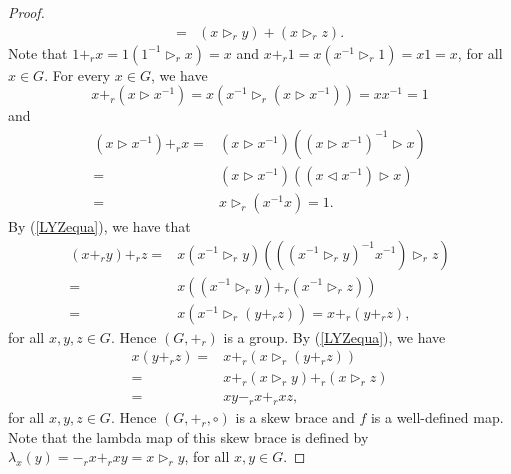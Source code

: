 \begin{proof}
\begin{align}
        =&(x\rhd_r y)+(x\rhd_r z).
    \end{align}
    Note that $1+_r x=1(1^{-1}\rhd_r x)=x$ and
    $x+_r 1=x(x^{-1}\rhd_r 1)=x1=x$,  for all $x\in G$. For every $x\in G$, we have
    \[x+_r (x\rhd x^{-1})=x(x^{-1}\rhd_r(x\rhd x^{-1}))=xx^{-1}=1\]
and
\begin{align*}
    (x\rhd x^{-1})+_r x=&(x\rhd x^{-1})((x\rhd x^{-1})^{-1}\rhd x)\\
    =&(x\rhd x^{-1})((x\lhd x^{-1})\rhd x)\\
    =&x\rhd_r(x^{-1}x)=1.
\end{align*}
By (\ref{LYZequa}), we have that
\begin{align*}
    (x+_r y)+_r z=&x(x^{-1}\rhd_r y)(((x^{-1}\rhd_r y)^{-1}x^{-1})\rhd_r z)\\
    =&x((x^{-1}\rhd_r y)+_r(x^{-1}\rhd_r z))\\
    =&x(x^{-1}\rhd_r(y+_r z))=x+_r (y+_r z),
\end{align*}
for all $x,y,z\in G$. Hence $(G,+_r)$ is a group. By (\ref{LYZequa}), we have
\begin{align*}
    x(y+_r z)=&x+_r(x\rhd_r (y+_r z))\\
    =&x+_r (x\rhd_r y)+_r(x\rhd_r z)\\
    =&xy-_r x+_r xz,
\end{align*}
for all $x,y,z\in G$. Hence $(G,+_r,\circ)$ is a skew brace and $f$ is a well-defined map. Note that the lambda map of this skew brace is defined by
$\lambda_x(y)=-_r x+_r xy=x\rhd_r y$, for all $x,y\in G$.


\end{proof}
